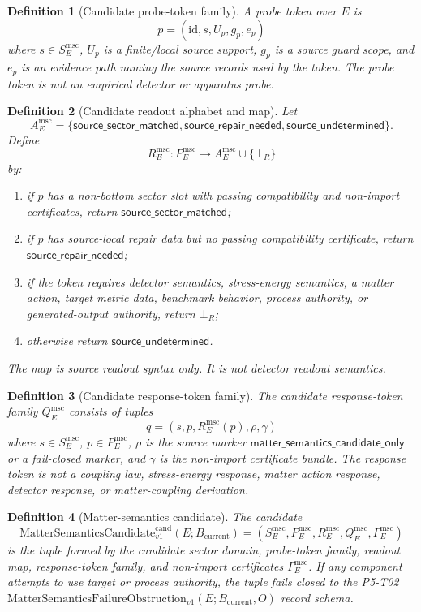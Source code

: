 \documentclass[11pt]{article}
\newcommand{\Bcur}{B_{\mathrm{current}}}
\newcommand{\FailureObs}{\mathrm{MatterSemanticsFailureObstruction}_{v1}}
\newcommand{\MSCand}{\mathrm{MatterSemanticsCandidate}^{\mathrm{cand}}_{v1}}
\newcommand{\BottomR}{\bot_R}
\newtheorem{definition}{Definition}
\begin{document}
\begin{definition}[Candidate probe-token family]
A probe token over \(E\) is
\[
  p=(\mathrm{id},s,U_p,g_p,e_p)
\]
where \(s\in S_E^{\mathrm{msc}}\), \(U_p\) is a finite/local source support,
\(g_p\) is a source guard scope, and \(e_p\) is an evidence path naming the
source records used by the token. The probe token is not an empirical detector
or apparatus probe.
\end{definition}

\begin{definition}[Candidate readout alphabet and map]
Let
\[
  A_E^{\mathrm{msc}}
  =
  \{\mathsf{source\_sector\_matched},
    \mathsf{source\_repair\_needed},
    \mathsf{source\_undetermined}\}.
\]
Define
\[
  R_E^{\mathrm{msc}}:P_E^{\mathrm{msc}}
  \longrightarrow A_E^{\mathrm{msc}}\cup\{\BottomR\}
\]
by:
\begin{enumerate}[label=\textup{(\alph*)}]
\item if \(p\) has a non-bottom sector slot with passing compatibility and
  non-import certificates, return \(\mathsf{source\_sector\_matched}\);
\item if \(p\) has source-local repair data but no passing compatibility
  certificate, return \(\mathsf{source\_repair\_needed}\);
\item if the token requires detector semantics, stress-energy semantics, a
  matter action, target metric data, benchmark behavior, process authority, or
  generated-output authority, return \(\BottomR\);
\item otherwise return \(\mathsf{source\_undetermined}\).
\end{enumerate}
The map is source readout syntax only. It is not detector readout semantics.
\end{definition}

\begin{definition}[Candidate response-token family]
The candidate response-token family \(Q_E^{\mathrm{msc}}\) consists of tuples
\[
  q=(s,p,R_E^{\mathrm{msc}}(p),\rho,\gamma)
\]
where \(s\in S_E^{\mathrm{msc}}\), \(p\in P_E^{\mathrm{msc}}\), \(\rho\) is
the source marker
\(\mathsf{matter\_semantics\_candidate\_only}\) or a fail-closed marker, and
\(\gamma\) is the non-import certificate bundle. The response token is not a
coupling law, stress-energy response, matter action response, detector
response, or matter-coupling derivation.
\end{definition}

\begin{definition}[Matter-semantics candidate]
The candidate
\[
  \MSCand(E;\Bcur)
  =
  (S_E^{\mathrm{msc}},P_E^{\mathrm{msc}},R_E^{\mathrm{msc}},
  Q_E^{\mathrm{msc}},\Gamma_E^{\mathrm{msc}})
\]
is the tuple formed by the candidate sector domain, probe-token family,
readout map, response-token family, and non-import certificates
\(\Gamma_E^{\mathrm{msc}}\). If any component attempts to use target or
process authority, the tuple fails closed to the P5-T02
\(\FailureObs(E;\Bcur,O)\) record schema.
\end{definition}
\end{document}

